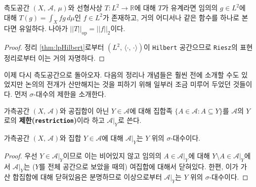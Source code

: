 \begin{corollary}
    측도공간 $(X,\,\mathcal{A},\,\mu)$와 선형사상 $T:L^2\to\mathbb{R}$에 대해 $T$가 유계라면 임의의 $g\in L^2$에 대해 $T(g)=\int_Xfg\,d\mu$인 $f\in L^2$가 존재하고, 거의 어디서나 같은 함수를 하나로 본다면 유일하다. 나아가 $||T||_{\mathrm{op}}=||f||_2$이다.
\end{corollary}

\begin{proof}
    정리 \ref{thm:lpHilbert}로부터 $(L^2,\,\langle\cdot,\,\cdot\rangle)$이 \texttt{Hilbert} 공간으므로 \texttt{Riesz}의 표현정리로부터 이는 거의 자명하다.
\end{proof}

이제 다시 측도공간으로 돌아오자. 다음의 정리나 개념들은 훨씬 전에 소개할 수도 있었지만 논의의 전개가 산만해지는 것을 피하기 위해 일부러 조금 미루어 두었던 것들이다. 먼저 $\sigma$-대수의 제한을 소개한다.

\begin{definition}
    가측공간 $(X,\,\mathcal{A})$와 공집합이 아닌 $Y\in\mathcal{A}$에 대해 집합족 $\{A\in\mathcal{A}:A\subseteq Y\}$를 $\mathcal{A}$의 $Y$로의 \textbf{제한(\texttt{restriction})}이라 하고 $\mathcal{A}\vert_Y$로 쓴다.
\end{definition}

\begin{proposition}\label{prop:restrictSigmaAlgebra}
    가측공간 $(X,\,\mathcal{A})$와 집합 $Y\in\mathcal{A}$에 대해 $\mathcal{A}\vert_Y$는 $Y$ 위의 $\sigma$-대수이다.
\end{proposition}

\begin{proof}
    우선 $Y\in\mathcal{A}\vert_Y$이므로 이는 비어있지 않고 임의의 $A\in\mathcal{A}\vert_Y$에 대해 $Y\setminus A\in\mathcal{A}\vert_Y$에서 $\mathcal{A}\vert_Y$는 ($Y$를 전체 공간으로 보았을 때의) 여집합에 대해서 닫혀있다. 한편, 이가 가산 합집합에 대해 닫혀있음은 분명하므로 이상으로부터 $\mathcal{A}\vert_Y$는 $Y$ 위의 $\sigma$-대수이다.
\end{proof}

